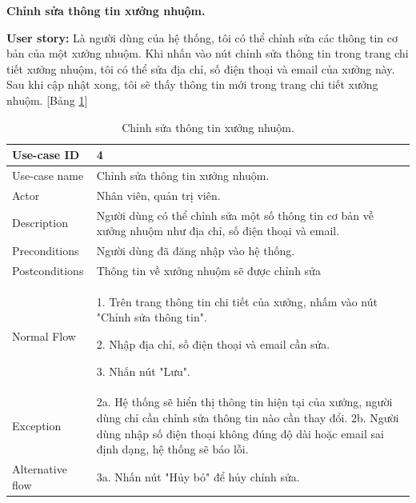 \textbf{Chỉnh sửa thông tin xưởng nhuộm.}\par
\textbf{User story:} Là người dùng của hệ thống, tôi có thể chỉnh sửa các thông tin cơ bản của một xưởng nhuộm. Khi nhấn vào nút chỉnh sửa thông tin trong trang chi tiết xưởng nhuộm, tôi có thể sửa địa chỉ, số điện thoại và email của xưởng này. Sau khi cập nhật xong, tôi sẽ thấy thông tin mới trong trang chi tiết xưởng nhuộm. [Bảng \ref{bang4}]
\begin{table}[H]
    \centering
    \begin{tabular}{|m{3cm}|m{10cm}|}
    \hline 
        Use-case ID & 4\\ \hline
        Use-case name & Chỉnh sửa thông tin xưởng nhuộm.\\ \hline
        Actor & Nhân viên, quản trị viên.\\ \hline
        Description & Người dùng có thể chỉnh sửa một số thông tin cơ bản về xưởng nhuộm như địa chỉ, số điện thoại và email.\\ \hline
        Preconditions & Người dùng đã đăng nhập vào hệ thống.\\ \hline
        Postconditions & Thông tin về xưởng nhuộm sẽ được chỉnh sửa\\ \hline
        Normal Flow & 
        1. Trên trang thông tin chi tiết của xưởng, nhấm vào nút "Chỉnh sửa thông tin".\par
        2. Nhập địa chỉ, số điện thoại và email cần sửa.\par
        3. Nhấn nút "Lưu".
        \\ \hline
        Exception & 
        2a. Hệ thống sẽ hiển thị thông tin hiện tại của xưởng, người dùng chỉ cần chỉnh sửa thông tin nào cần thay đổi.
        2b. Người dùng nhập số điện thoại không đúng độ dài hoặc email sai định dạng, hệ thống sẽ báo lỗi.
        \\ \hline
        Alternative flow & 
        3a. Nhấn nút "Hủy bỏ" để hủy chỉnh sửa.
        \\ 
    \hline 
    \end{tabular}
    \caption{Chỉnh sửa thông tin xưởng nhuộm.}
    \label{bang4}
\end{table}


